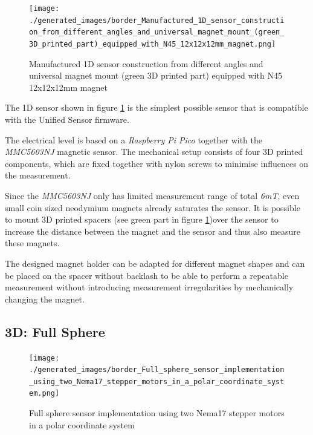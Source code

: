 \begin{figure}
\centering
\texttt{[image: ./generated\_images/border\_Manufactured\_1D\_sensor\_construction\_from\_different\_angles\_and\_universal\_magnet\_mount\_(green\_3D\_printed\_part)\_equipped\_with\_N45\_12x12x12mm\_magnet.png]}
\caption{Manufactured 1D sensor construction from different angles and
universal magnet mount (green 3D printed part) equipped with N45
12x12x12mm magnet
\label{Manufactured_1D_sensor_construction_from_different_angles_and_universal_magnet_mount_(green_3D_printed_part)_equipped_with_N45_12x12x12mm_magnet.png}}
\end{figure}

The 1D sensor shown in figure
\ref{Manufactured_1D_sensor_construction_from_different_angles_and_universal_magnet_mount_(green_3D_printed_part)_equipped_with_N45_12x12x12mm_magnet.png}
is the simplest possible sensor that is compatible with the Unified
Sensor firmware.

The electrical level is based on a \emph{Raspberry Pi Pico} together
with the \emph{MMC5603NJ} magnetic sensor. The mechanical setup consists
of four 3D printed components, which are fixed together with nylon
screws to minimise influences on the measurement.

Since the \emph{MMC5603NJ} only has limited measurement range of total
\emph{6mT}, even small coin sized neodymium magnets already saturates
the sensor. It is possible to mount 3D printed spacers (see green part
in figure
\ref{Manufactured_1D_sensor_construction_from_different_angles_and_universal_magnet_mount_(green_3D_printed_part)_equipped_with_N45_12x12x12mm_magnet.png})over
the sensor to increase the distance between the magnet and the sensor
and thus also measure these magnets.

The designed magnet holder can be adapted for different magnet shapes
and can be placed on the spacer without backlash to be able to perform a
repeatable measurement without introducing measurement irregularities by
mechanically changing the magnet.

\hypertarget{d-full-sphere}{%
\subsection{3D: Full Sphere}\label{d-full-sphere}}

\begin{figure}
\centering
\texttt{[image: ./generated\_images/border\_Full\_sphere\_sensor\_implementation\_using\_two\_Nema17\_stepper\_motors\_in\_a\_polar\_coordinate\_system.png]}
\caption{Full sphere sensor implementation using two Nema17 stepper
motors in a polar coordinate system
\label{Full_sphere_sensor_implementation_using_two_Nema17_stepper_motors_in_a_polar_coordinate_system.png}}
\end{figure}

